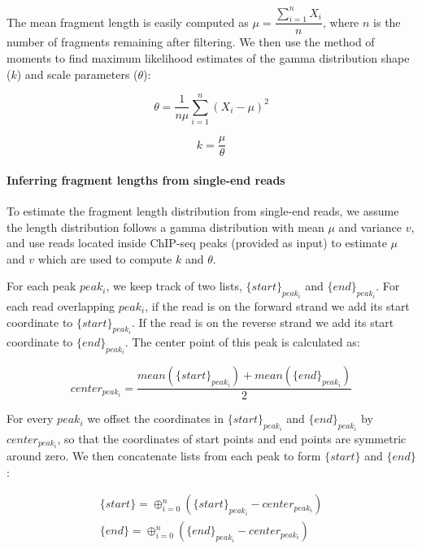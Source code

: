 \documentclass[12pt]{article}
\begin{document}
The mean fragment length is easily computed as $\mu = \dfrac{\sum_{i=1}^{n}X_i}{n}$, where $n$ is the number of fragments remaining after filtering. We then use the method of moments to find maximum likelihood estimates of the gamma distribution shape ($k$) and scale parameters ($\theta$):

\begin{equation}
  \theta = \dfrac{1}{n\mu}\sum_{i=1}^{n}(X_i - \mu)^2
\end{equation}

\begin{equation}
  k =  \dfrac{\mu}{\theta}
\end{equation}

\paragraph{Inferring fragment lengths from single-end reads}
To estimate the fragment length distribution from single-end reads, we assume the length distribution follows a gamma distribution with mean $\mu$ and variance $v$, and use reads located inside ChIP-seq peaks (provided as input) to estimate $\mu$ and $v$ which are used to compute $k$ and $\theta$.

For each peak $peak_i$, we keep track of two lists, $\{start\}_{peak_i}$ and $\{end\}_{peak_i}$.
For each read overlapping $peak_i$, if the read is on the forward strand we add its start coordinate to $\{start\}_{peak_i}$.
If the read is on the reverse strand we add its start coordinate to $\{end\}_{peak_i}$.
The center point of this peak is calculated as:

\begin{equation} \label{eq:center}
  center_{peak_i} = \frac{mean(\{start\}_{peak_i}) + mean(\{end\}_{peak_i})}{2}
\end{equation}
  
For every $peak_i$ we offset the coordinates in $\{start\}_{peak_i}$ and $\{end\}_{peak_i}$ by $center_{peak_i}$, so that the coordinates of start points and end points are symmetric around zero.
We then concatenate lists from each peak to form $\{start\}$ and $\{end\}$:

\begin{equation} \label{eq:concat}
  \begin{array}{c}
  \{start\} = \oplus_{i=0}^{n} (\{start\}_{peak_i} - center_{peak_i})\\
  \{end\} = \oplus_{i=0}^{n} (\{end\}_{peak_i} - center_{peak_i})
  \end{array}
\end{equation}
\end{document}
